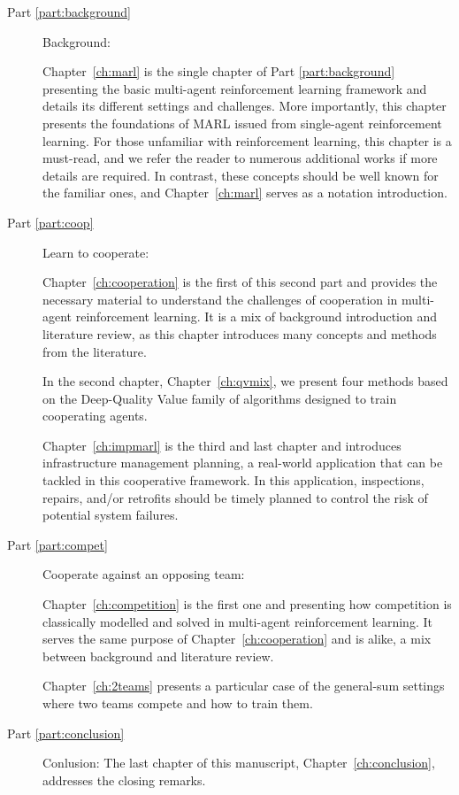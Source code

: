\begin{description}
    \item [Part \ref{part:background}] Background:
    
    Chapter~\ref{ch:marl} is the single chapter of Part \ref{part:background} presenting the basic multi-agent reinforcement learning framework and details its different settings and challenges.
    More importantly, this chapter presents the foundations of MARL issued from single-agent reinforcement learning.
    For those unfamiliar with reinforcement learning, this chapter is a must-read, and we refer the reader to numerous additional works if more details are required.
    In contrast, these concepts should be well known for the familiar ones, and Chapter~\ref{ch:marl} serves as a notation introduction.

    \item [Part \ref{part:coop}] Learn to cooperate:
    
    Chapter~\ref{ch:cooperation} is the first of this second part and provides the necessary material to understand the challenges of cooperation in multi-agent reinforcement learning.
    It is a mix of background introduction and literature review, as this chapter introduces many concepts and methods from the literature.
    
    In the second chapter, Chapter~\ref{ch:qvmix}, we present four methods based on the Deep-Quality Value family of algorithms designed to train cooperating agents.
    
    Chapter~\ref{ch:impmarl} is the third and last chapter and introduces infrastructure management planning, a real-world application that can be tackled in this cooperative framework.
    In this application, inspections, repairs, and/or retrofits should be timely planned to control the risk of potential system failures.
    
    \item [Part \ref{part:compet}]  Cooperate against an opposing team:
    
    Chapter~\ref{ch:competition} is the first one and presenting how competition is classically modelled and solved in multi-agent reinforcement learning.
    It serves the same purpose of Chapter~\ref{ch:cooperation} and is alike, a mix between background and literature review.
    
    Chapter~\ref{ch:2teams} presents a particular case of the general-sum settings where two teams compete and how to train them.

    \item [Part \ref{part:conclusion}] Conlusion:
    The last chapter of this manuscript, Chapter~\ref{ch:conclusion}, addresses the closing remarks.
\end{description}

